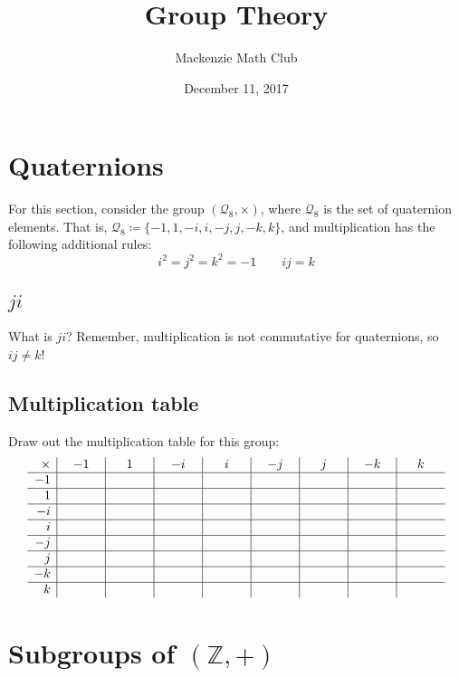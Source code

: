 

\title{Group Theory}
\author{Mackenzie Math Club}
\date{December 11, 2017}



	\section{Quaternions}
		For this section, consider the group $(\mathcal{Q}_8, \times)$, where $\mathcal{Q}_8$ is the set of quaternion elements. That is, $\mathcal{Q}_8 \coloneqq \{-1, 1, -i, i, -j, j, -k, k\}$, and multiplication has the following additional rules:
		\[i^2 = j^2 = k^2 = -1 \qquad ij = k\]
		\vspace{-10ex}
		\subsection{$ji$}
			What is $ji$? Remember, multiplication is not commutative for quaternions, so $ij \neq k$!
			\solutionspace{1ex}
		\subsection{Multiplication table}
			Draw out the multiplication table for this group:
			\begin{equation*}
				\begin{array}{r|c|c|c|c|c|c|c|c}
					\times & \mathmakebox[1cm]{-1} & \mathmakebox[1cm]{1} & \mathmakebox[1cm]{-i} & \mathmakebox[1cm]{i} & \mathmakebox[1cm]{-j} & \mathmakebox[1cm]{j} & \mathmakebox[1cm]{-k} & \mathmakebox[1cm]{k}\\\hline
					-1     &    &   &    &   &    &   &    &  \\\hline
					1      &    &   &    &   &    &   &    &  \\\hline
					-i     &    &   &    &   &    &   &    &  \\\hline
					i      &    &   &    &   &    &   &    &  \\\hline
					-j     &    &   &    &   &    &   &    &  \\\hline
					j      &    &   &    &   &    &   &    &  \\\hline
					-k     &    &   &    &   &    &   &    &  \\\hline
					k      &    &   &    &   &    &   &    &
				\end{array}
			\end{equation*}
	\section{Subgroups of $(\mathbb{Z}, +)$}

